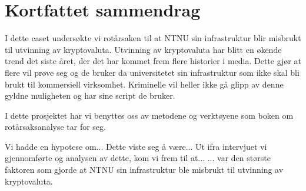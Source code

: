 \chapter*{Kortfattet sammendrag}
I dette caset undersøkte vi rotårsaken til at NTNU sin infrastruktur blir misbrukt til utvinning av kryptovaluta. Utvinning av kryptovaluta har blitt en økende trend det siste året, der det har kommet frem flere historier i media. Dette gjør at flere vil prøve seg og de bruker da universitetet sin infrastruktur som ikke skal bli brukt til kommersiell virksomhet. Kriminelle vil heller ikke gå glipp av denne gyldne muligheten og har sine script de bruker. 

I dette prosjektet har vi benyttes oss av metodene og verktøyene som boken om rotårsaksanalyse \cite{RCA} tar for seg.

Vi hadde en hypotese om... Dette viste seg å være... Ut ifra intervjuet vi gjennomførte og analysen av dette, kom vi frem til at... ... var den største faktoren som gjorde at NTNU sin infrastruktur ble misbrukt til utvinning av kryptovaluta.